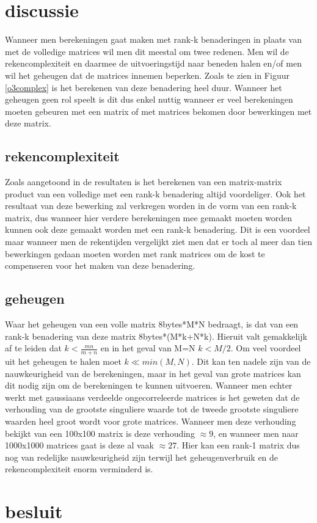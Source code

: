 \documentclass[a4paper]{article}
\begin{document}
\section*{discussie}

Wanneer men berekeningen gaat maken met rank-k benaderingen in plaats van met de volledige matrices wil men dit meestal om twee redenen. Men wil de rekencomplexiteit en daarmee de uitvoeringstijd naar beneden halen en/of men wil het geheugen dat de matrices innemen beperken. Zoals te zien in Figuur \ref{o3complex} is het berekenen van deze benadering heel duur. Wanneer het geheugen geen rol speelt is dit dus enkel nuttig wanneer er veel berekeningen moeten gebeuren met een matrix of met matrices bekomen door bewerkingen met deze matrix. 

\subsection*{rekencomplexiteit}

Zoals aangetoond in de resultaten is het berekenen van een matrix-matrix product van een volledige met een rank-k benadering altijd voordeliger. Ook het resultaat van deze bewerking zal verkregen worden in de vorm van een rank-k matrix, dus wanneer hier verdere berekeningen mee gemaakt moeten worden kunnen ook deze gemaakt worden met een rank-k benadering. Dit is een voordeel maar wanneer men de rekentijden vergelijkt ziet men dat er toch al meer dan tien bewerkingen gedaan moeten worden met rank matrices om de kost te compenseren voor het maken van deze benadering.

\subsection*{geheugen}
Waar het geheugen van een volle matrix 8bytes*M*N bedraagt, is dat van een rank-k benadering van deze matrix 8bytes*(M*k+N*k). Hieruit valt gemakkelijk af te leiden dat $k<\frac{mn}{m+n}$ en in het geval van M=N $k<M/2$. Om veel voordeel uit het geheugen te halen moet $k\ll min(M,N)$. Dit kan ten nadele zijn van de nauwkeurigheid van de berekeningen, maar in het geval van grote matrices kan dit nodig zijn om de berekeningen te kunnen uitvoeren. Wanneer men echter werkt met gaussiaans verdeelde ongecorreleerde matrices is het geweten dat de verhouding van de grootste singuliere waarde tot de tweede grootste singuliere waarden heel groot wordt voor grote matrices. Wanneer men deze verhouding bekijkt van een 100x100 matrix is deze verhouding $\approx 9$, en wanneer men naar 1000x1000 matrices gaat is deze al vaak $\approx 27$. Hier kan een rank-1 matrix dus nog van redelijke nauwkeurigheid zijn terwijl het geheugenverbruik en de rekencomplexiteit enorm verminderd is.

\section*{besluit}
\end{document}
